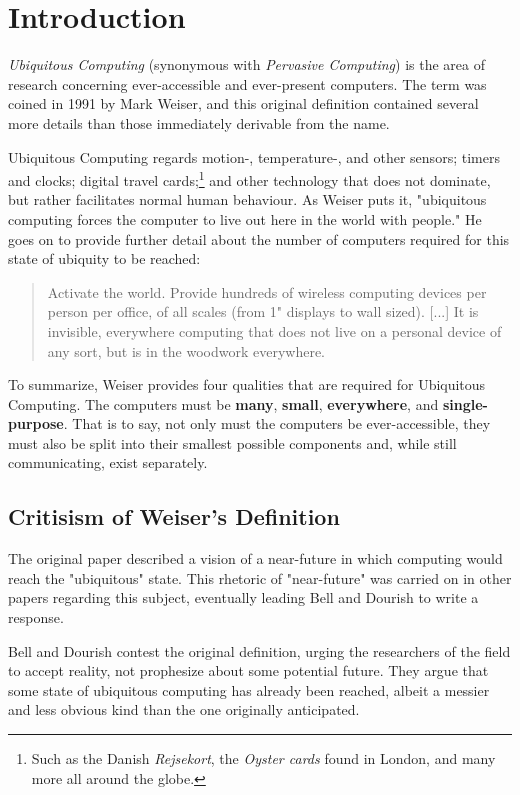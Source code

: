 \section{Introduction}

\emph{Ubiquitous Computing} (synonymous with \emph{Pervasive Computing}) is the area of research concerning
ever-accessible and ever-present computers. The term was coined in 1991 by Mark Weiser, and this original
definition contained several more details than those immediately derivable from the name.

Ubiquitous Computing regards motion-, temperature-, and other sensors; timers and clocks; digital travel
cards;\footnote{Such as the Danish \emph{Rejsekort}, the \emph{Oyster cards} found in London, and many more
all around the globe.} and other technology that does not dominate, but rather facilitates normal human
behaviour. As Weiser puts it, "ubiquitous computing forces the computer to live out here in the world with
people."\cite{weiseronline} He goes on to provide further detail about the number of computers required for
this state of ubiquity to be reached:

\begin{quote}
     Activate the world. Provide hundreds of wireless computing devices per person per
     office, of all scales (from 1" displays to wall sized). [...] It is invisible, everywhere computing that does
     not live on a personal device of any sort, but is in the woodwork everywhere.\cite{weiseronline}
\end{quote}

To summarize, Weiser provides four qualities that are required for Ubiquitous Computing. The computers must be \textbf{many},
\textbf{small}, \textbf{everywhere}, and \textbf{single-purpose}. That is to say, not only must the computers be ever-accessible,
they must also be split into their smallest possible components and, while still communicating, exist separately.\cite{weiser91}

\subsection{Critisism of Weiser's Definition}

The original paper described a vision of a near-future in which computing would reach the "ubiquitous" state.
This rhetoric of "near-future" was carried on in other papers regarding this subject, eventually leading Bell
and Dourish to write a response.

Bell and Dourish contest the original definition, urging the researchers of the field to accept reality, not
prophesize about some potential future. They argue that some state of ubiquitous computing has already been
reached, albeit a messier and less obvious kind than the one originally anticipated.

